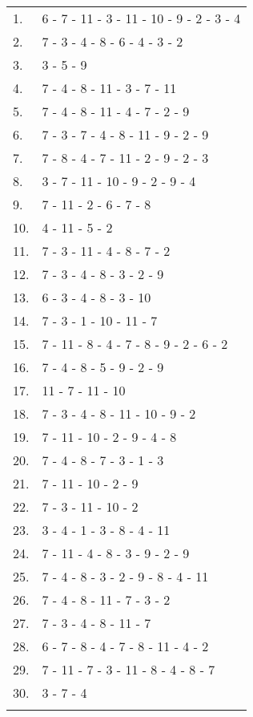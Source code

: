 \begin{table}[H]
  \begin{tabular}{ll}
    1. & 6 - 7 - 11 - 3 - 11 - 10 - 9 - 2 - 3 - 4\\
    2. & 7 - 3 - 4 - 8 - 6 - 4 - 3 - 2\\
    3. & 3 - 5 - 9\\
    4. & 7 - 4 - 8 - 11 - 3 - 7 - 11\\
    5. & 7 - 4 - 8 - 11 - 4 - 7 - 2 - 9\\
    6. & 7 - 3 - 7 - 4 - 8 - 11 - 9 - 2 - 9\\
    7. & 7 - 8 - 4 - 7 - 11 - 2 - 9 - 2 - 3\\
    8. & 3 - 7 - 11 - 10 - 9 - 2 - 9 - 4\\
    9. & 7 - 11 - 2 - 6 - 7 - 8\\
    10.& 4 - 11 - 5 - 2\\
    11.& 7 - 3 - 11 - 4 - 8 - 7 - 2\\
    12.& 7 - 3 - 4 - 8 - 3 - 2 - 9\\
    13.& 6 - 3 - 4 - 8 - 3 - 10\\
    14.& 7 - 3 - 1 - 10 - 11 - 7\\
    15.& 7 - 11 - 8 - 4 - 7 - 8 - 9 - 2 - 6 - 2\\
    16.& 7 - 4 - 8 - 5 - 9 - 2 - 9\\
    17.& 11 - 7 - 11 - 10\\
    18.& 7 - 3 - 4 - 8 - 11 - 10 - 9 - 2\\
    19.& 7 - 11 - 10 - 2 - 9 - 4 - 8\\
    20.& 7 - 4 - 8 - 7 - 3 - 1 - 3\\
    21.& 7 - 11 - 10 - 2 - 9\\
    22.& 7 - 3 - 11 - 10 - 2\\
    23.& 3 - 4 - 1 - 3 - 8 - 4 - 11\\
    24.& 7 - 11 - 4 - 8 - 3 - 9 - 2 - 9\\
    25.& 7 - 4 - 8 - 3 - 2 - 9 - 8 - 4 - 11\\
    26.& 7 - 4 - 8 - 11 - 7 - 3 - 2 \\
    27.& 7 - 3 - 4 - 8 - 11 - 7\\
    28.& 6 - 7 - 8 - 4 - 7 - 8 - 11 - 4 - 2\\
    29.& 7 - 11 - 7 - 3 - 11 - 8 - 4 - 8 - 7\\
    30.& 3 - 7 - 4\\
    \\
  \end{tabular}
\end{table}

